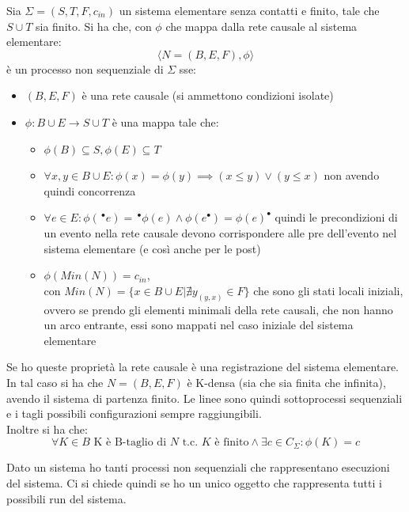 \begin{definizione}
  Sia $\Sigma=(S, T, F, c_{in})$ un sistema elementare senza contatti e finito,
  tale che $S\cup T$ sia finito. Si ha che, con $\phi$ che mappa dalla rete
  causale al sistema elementare: 
  \[\langle N=(B, E, F), \phi\rangle\]
  è un processo non sequenziale di $\Sigma$ sse:
  \begin{itemize}
    \item $(B, E, F)$ è una rete causale (si ammettono condizioni isolate)
    \item $\phi:B\cup E\to S\cup T$ è una mappa tale che:
    \begin{itemize}
      \item $\phi(B)\subseteq S, \phi(E)\subseteq T$
      \item $\forall x, y\in B\cup E:\phi(x)=\phi(y)\implies (x\leq y)\lor (y\leq
      x)$ non avendo quindi concorrenza
      \item $\forall e\in E:\phi(\,^\bullet e)=\,^\bullet
      \phi(e)\land\phi(e^\bullet)=\phi(e)^\bullet$ quindi le precondizioni di un
      evento nella rete causale devono corrispondere alle pre dell'evento nel
      sistema elementare (e così anche per le post)
      \item $\phi(Min(N))=c_{in}$,\\ con $Min(N)=\{x\in B\cup E|\nexists
      y_(y, x)\in F\}$ che sono gli stati locali iniziali, ovvero se prendo gli
      elementi minimali della rete 
      causali, che non hanno un arco entrante, essi sono mappati nel caso
      iniziale del sistema elementare
    \end{itemize}
  \end{itemize}
  Se ho queste proprietà la rete causale è una registrazione del sistema
  elementare.\\
  In tal caso si ha che $N=(B, E, F)$ è K-densa (sia che sia finita che infinita),
  avendo il sistema di partenza finito. Le linee sono quindi sottoprocessi
  sequenziali e i tagli possibili configurazioni sempre raggiungibili.\\
  Inoltre si ha che:
  \[\forall K\in B\mbox{ K è B-taglio di } N \mbox{ t.c. } K \mbox{ è finito}
    \land \exists c\in C_\Sigma:\phi(K)=c\]
\end{definizione} \vspace{5mm} %
Dato un sistema ho tanti processi non sequenziali che rappresentano esecuzioni
del sistema. Ci si chiede quindi se ho un unico oggetto che rappresenta tutti i
possibili run del sistema.
